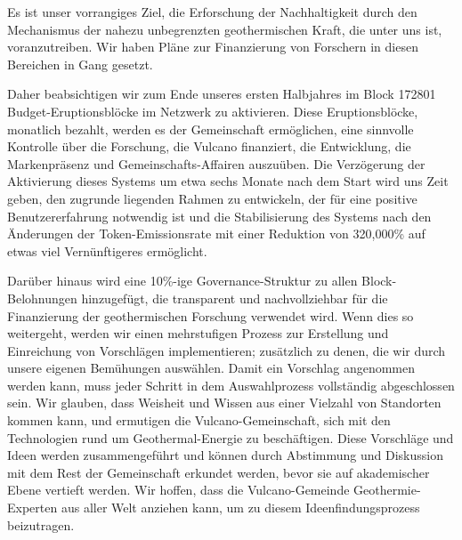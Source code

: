 \documentclass[A4paper, 12pt]{article}
\begin{document}
Es ist unser vorrangiges Ziel, die Erforschung der Nachhaltigkeit durch den Mechanismus der nahezu unbegrenzten geothermischen Kraft, die unter uns ist, voranzutreiben. Wir haben Pläne zur Finanzierung von Forschern in diesen Bereichen in Gang gesetzt. 

Daher beabsichtigen wir zum Ende unseres ersten Halbjahres im Block 172801 Budget-Eruptionsblöcke im Netzwerk zu aktivieren. Diese Eruptionsblöcke, monatlich bezahlt, werden es der Gemeinschaft ermöglichen, eine sinnvolle Kontrolle über die Forschung, die Vulcano finanziert, die Entwicklung, die Markenpräsenz und Gemeinschafts-Affairen auszuüben. Die Verzögerung der Aktivierung dieses Systems um etwa sechs Monate nach dem Start wird uns Zeit geben, den zugrunde liegenden Rahmen zu entwickeln, der für eine positive Benutzererfahrung notwendig ist und die Stabilisierung des Systems  nach den Änderungen der Token-Emissionsrate mit einer Reduktion von 320,000\% auf etwas viel Vernünftigeres ermöglicht. 

Darüber hinaus wird eine 10\%-ige Governance-Struktur zu allen Block-Belohnungen hinzugefügt, die transparent und nachvollziehbar für die Finanzierung der geothermischen Forschung verwendet wird. Wenn dies so weitergeht, werden wir einen mehrstufigen Prozess zur Erstellung und Einreichung von Vorschlägen implementieren; zusätzlich zu denen, die wir durch unsere eigenen Bemühungen auswählen. Damit ein Vorschlag angenommen werden kann, muss jeder Schritt in dem Auswahlprozess vollständig abgeschlossen sein. Wir glauben, dass Weisheit und Wissen aus einer Vielzahl von Standorten kommen kann, und ermutigen die Vulcano-Gemeinschaft, sich mit den Technologien rund um Geothermal-Energie zu beschäftigen. Diese Vorschläge und Ideen werden zusammengeführt und können durch Abstimmung und Diskussion mit dem Rest der Gemeinschaft erkundet werden, bevor sie auf akademischer Ebene vertieft werden. Wir hoffen, dass die Vulcano-Gemeinde Geothermie-Experten aus aller Welt anziehen kann, um zu diesem Ideenfindungsprozess beizutragen. 
\end{document}
